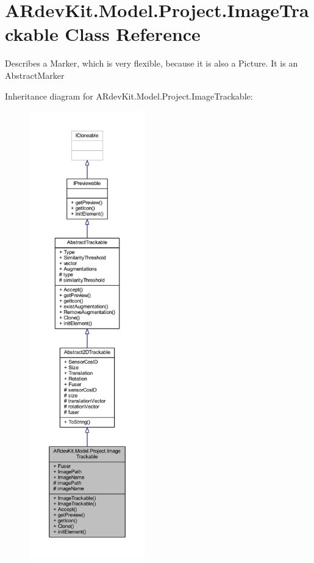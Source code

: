 \hypertarget{class_a_rdev_kit_1_1_model_1_1_project_1_1_image_trackable}{\section{A\-Rdev\-Kit.\-Model.\-Project.\-Image\-Trackable Class Reference}
\label{class_a_rdev_kit_1_1_model_1_1_project_1_1_image_trackable}
}


Describes a Marker, which is very flexible, because it is also a Picture. It is an Abstract\-Marker  




Inheritance diagram for A\-Rdev\-Kit.\-Model.\-Project.\-Image\-Trackable\-:
\nopagebreak
\begin{figure}[H]
\begin{center}
\leavevmode
\includegraphics[height=550pt]{class_a_rdev_kit_1_1_model_1_1_project_1_1_image_trackable__inherit__graph}
\end{center}
\end{figure}


